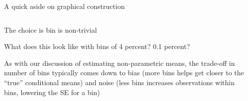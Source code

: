 \documentclass[notes,11pt, aspectratio=169]{beamer}
\newenvironment{wideitemize}{\itemize\addtolength{\itemsep}{10pt}}{\enditemize}
\begin{document}
\begin{frame}{A quick aside on graphical construction}
  \begin{columns}[onlytextwidth, T] %
    \begin{column}{.5\textwidth}
      \begin{wideitemize}
      \item The choice is bin is non-trivial
      \item What does this look like with bins of 4 percent? 0.1 percent?
      \item<3-> As with our discussion of estimating non-parametric
        means, the trade-off in number of bins typically comes down to
        bias (more bins helps get closer to the ``true'' conditional
        means) and noise (less bins increases observations within
        bins, lowering the SE for a bin)
      \end{wideitemize}
    \end{column}%
    \hfill%
    \begin{column}{.5\textwidth}
    \end{column}%
  \end{columns}
\end{frame}
\end{document}
